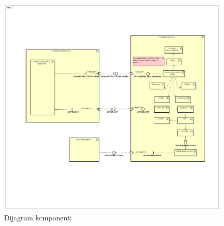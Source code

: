 			 \begin{figure}[H]
				\includegraphics[scale=0.3]{slike/dijagram_komponenti.png} %
				\centering
				\caption{Dijagram komponenti}
				\label{fig:promjene}
			\end{figure}
			 
		